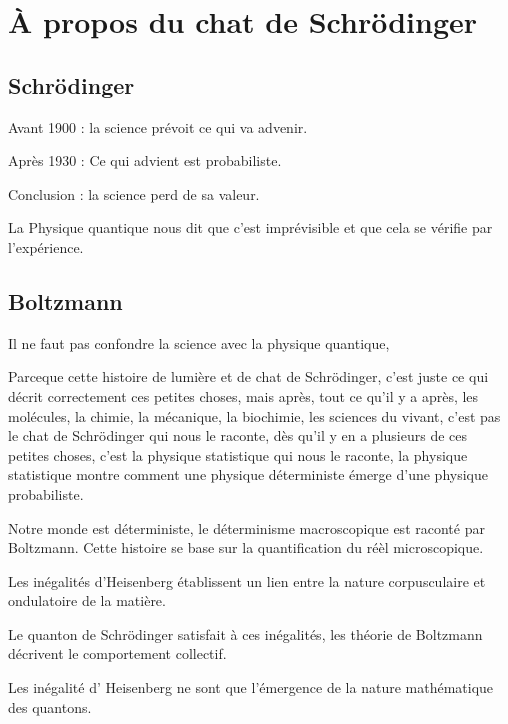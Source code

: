 \section{À propos du chat de Schrödinger}

\subsection{Schrödinger}
Avant 1900 : la science prévoit ce qui va advenir.

Après 1930 : Ce qui advient est probabiliste.

Conclusion : la science perd de sa valeur.

La Physique quantique nous dit que c'est imprévisible et que cela se vérifie par l'expérience.

\subsection{Boltzmann}
Il ne faut pas confondre la science avec la physique quantique, 

Parceque cette histoire de lumière et de chat de Schrödinger, c'est juste ce qui décrit correctement ces petites choses, mais après, tout ce qu'il y a après, les molécules, la chimie, la mécanique, la biochimie, les sciences du vivant, c'est pas le chat de Schrödinger qui nous le raconte, dès qu'il y en a plusieurs de ces petites choses, c'est la physique statistique qui nous le raconte,  la physique statistique montre comment une physique déterministe émerge d'une physique probabiliste.

Notre monde est déterministe,
le déterminisme macroscopique est raconté par Boltzmann. Cette histoire se base sur la quantification du réèl microscopique.

Les inégalités d'Heisenberg établissent un lien entre la nature corpusculaire et ondulatoire de la matière.

Le quanton de Schrödinger satisfait à ces inégalités, les théorie de Boltzmann décrivent le comportement collectif.

Les inégalité d' Heisenberg ne sont que l'émergence de la nature mathématique des quantons.

